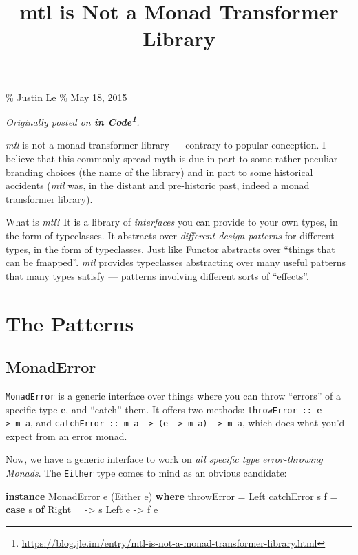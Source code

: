 \documentclass[]{article}
\title{mtl is Not a Monad Transformer Library}
\newenvironment{Shaded}{}{}
\newcommand{\DataTypeTok}[1]{\textcolor[rgb]{0.56,0.13,0.00}{#1}}
\newcommand{\KeywordTok}[1]{\textcolor[rgb]{0.00,0.44,0.13}{\textbf{#1}}}
\newcommand{\NormalTok}[1]{#1}
\newcommand{\OtherTok}[1]{\textcolor[rgb]{0.00,0.44,0.13}{#1}}
\renewcommand{\href}[2]{#2\footnote{\url{#1}}}
\begin{document}
\maketitle

\% Justin Le \% May 18, 2015

\emph{Originally posted on
\textbf{\href{https://blog.jle.im/entry/mtl-is-not-a-monad-transformer-library.html}{in
Code}}.}

\emph{mtl} is not a monad transformer library --- contrary to popular
conception. I believe that this commonly spread myth is due in part to some
rather peculiar branding choices (the name of the library) and in part to some
historical accidents (\emph{mtl} was, in the distant and pre-historic past,
indeed a monad transformer library).

What is \emph{mtl}? It is a library of \emph{interfaces} you can provide to your
own types, in the form of typeclasses. It abstracts over \emph{different design
patterns} for different types, in the form of typeclasses. Just like Functor
abstracts over ``things that can be fmapped''. \emph{mtl} provides typeclasses
abstracting over many useful patterns that many types satisfy --- patterns
involving different sorts of ``effects''.

\section{The Patterns}\label{the-patterns}

\subsection{MonadError}\label{monaderror}

\texttt{MonadError} is a generic interface over things where you can throw
``errors'' of a specific type \texttt{e}, and ``catch'' them. It offers two
methods: \texttt{throwError\ ::\ e\ -\textgreater{}\ m\ a}, and
\texttt{catchError\ ::\ m\ a\ -\textgreater{}\ (e\ -\textgreater{}\ m\ a)\ -\textgreater{}\ m\ a},
which does what you'd expect from an error monad.

Now, we have a generic interface to work on \emph{all specific type
error-throwing Monads}. The \texttt{Either} type comes to mind as an obvious
candidate:

\begin{Shaded}
\begin{Highlighting}[]
\KeywordTok{instance} \DataTypeTok{MonadError}\NormalTok{ e (}\DataTypeTok{Either}\NormalTok{ e) }\KeywordTok{where}
\NormalTok{    throwError }\OtherTok{=} \DataTypeTok{Left}
\NormalTok{    catchError s f }\OtherTok{=} \KeywordTok{case}\NormalTok{ s }\KeywordTok{of}
                       \DataTypeTok{Right}\NormalTok{ \_ }\OtherTok{{-}\textgreater{}}\NormalTok{ s}
                       \DataTypeTok{Left}\NormalTok{ e  }\OtherTok{{-}\textgreater{}}\NormalTok{ f e}
\end{Highlighting}
\end{Shaded}
\end{document}

